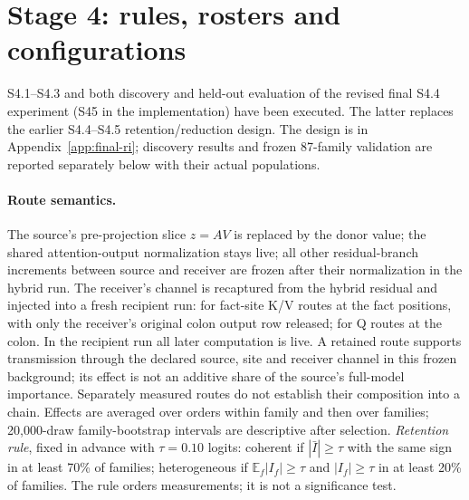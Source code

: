 \section{Stage 4: rules, rosters and configurations}
\label{app:stage4}

S4.1--S4.3 and both discovery and held-out evaluation of the revised final
S4.4 experiment (S45 in the implementation) have been executed. The latter
replaces the earlier S4.4--S4.5 retention/reduction design. The design is in
Appendix~\ref{app:final-ri}; discovery results and frozen 87-family validation
are reported separately below with their actual populations.

\paragraph{Route semantics.}
The source's pre-projection slice $z=AV$ is replaced by the donor value; the shared
attention-output normalization stays live; all other residual-branch increments
between source and receiver are frozen after their normalization in the hybrid run.
The receiver's channel is recaptured from the hybrid residual and injected into a
fresh recipient run: for fact-site K/V routes at the fact positions, with only the
receiver's original colon output row released; for Q routes at the colon. In the
recipient run all later computation is live. A retained route supports transmission
through the declared source, site and receiver channel in this frozen background;
its effect is not an additive share of the source's full-model importance.
Separately measured routes do not establish their composition into a chain.
Effects are averaged over orders
within family and then over families; 20,000-draw family-bootstrap intervals are
descriptive after selection. \emph{Retention rule}, fixed in advance with
$\tau=0.10$ logits: coherent if $|\bar I|\ge\tau$ with the same sign in at least
70\% of families; heterogeneous if $\mathbb{E}_f|I_f|\ge\tau$ and $|I_f|\ge\tau$ in
at least 20\% of families. The rule orders measurements; it is not a significance
test.

